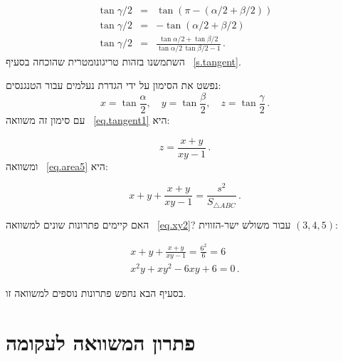 \begin{eqnarray}
\tan\gamma/2 &=& \tan(\pi - (\alpha/2 + \beta/2))\\
\tan\gamma/2&=& -\tan (\alpha/2 + \beta/2)\\
\tan\gamma/2&=& \frac{\tan\alpha/2 + \tan\beta/2}{\tan\alpha/2 \, \tan\beta/2-1}\,.\label{eq.tangent1}
\end{eqnarray}
השתמשנו בזהות טריגונומטרית שהוכחה בסעיף~
\ref{s.tangent}.

נפשט את הסימון על ידי הגדרת נעלמים עבור הטנגנסים:
\[
x=\tan \frac{\alpha}{2},\quad
y=\tan \frac{\beta}{2},\quad
z=\tan \frac{\gamma}{2}\,.
\]
עם סימון זה משוואה~%
\ref{eq.tangent1}
היא:

\begin{equation}
z = \frac{x+y}{xy-1}\,.\label{eq.xy1}
\end{equation}
ומשוואה~%
\ref{eq.area5}
היא:

\begin{equation}
x+y+\frac{x+y}{xy-1}=\frac{s^2}{S_{\triangle ABC}}\,.\label{eq.xy2}
\end{equation}



האם קיימים פתרונות שונים למשוואה%
~\ref{eq.xy2}?
עבור משולש ישר-הזווית
$(3,4,5)$:

\begin{eqnarray}
x+y+\frac{x+y}{xy-1}=\frac{6^2}{6}=6\\
x^2y + xy^2 -6xy + 6 = 0\,.\label{eq.elliptic}
\end{eqnarray}



בסעיף הבא נחפש פתרונות נוספים למשוואה זו.



\section{פתרון המשוואה לעקומה}

